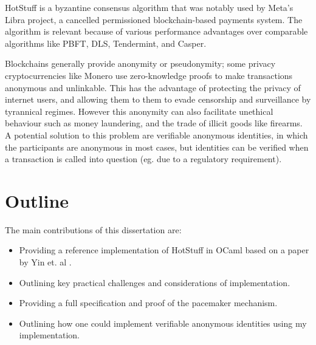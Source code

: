 HotStuff is a byzantine consensus algorithm that was notably used by Meta's Libra project, a cancelled permissioned blockchain-based payments system. The algorithm is relevant because of various performance advantages over comparable algorithms like PBFT, DLS, Tendermint, and Casper.

Blockchains generally provide anonymity or pseudonymity; some privacy cryptocurrencies like Monero use zero-knowledge proofs to make transactions anonymous and unlinkable. This has the advantage of protecting the privacy of internet users, and allowing them to them to evade censorship and surveillance by tyrannical regimes. However this anonymity can also facilitate unethical behaviour such as money laundering, and the trade of illicit goods like firearms. A potential solution to this problem are verifiable anonymous identities, in which the participants are anonymous in most cases, but identities can be verified when a transaction is called into question (eg. due to a regulatory requirement).

\section{Outline}
The main contributions of this dissertation are:
\begin{itemize}
	\item Providing a reference implementation of HotStuff in OCaml based on a paper by Yin et. al \cite{yin2019hotstuff}.
	\item Outlining key practical challenges and considerations of implementation.
	\item Providing a full specification and proof of the pacemaker mechanism.
	\item Outlining how one could implement verifiable anonymous identities \cite{hardjono2019verifiable} using my implementation.
\end{itemize}

